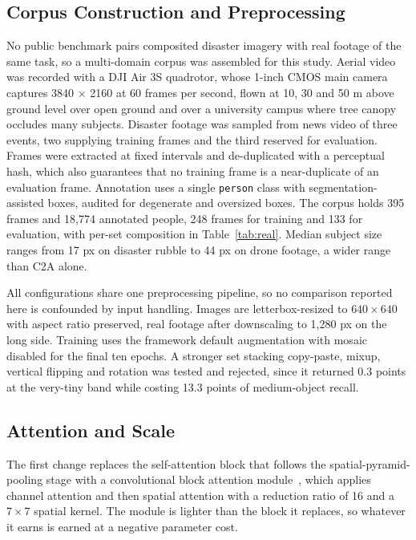 \documentclass[conference,a4paper]{IEEEtran}
\begin{document}
\subsection{Corpus Construction and Preprocessing}
\label{sec:corpus}
No public benchmark pairs composited disaster imagery with real footage of the
same task, so a multi-domain corpus was assembled for this study. Aerial video
was recorded with a DJI Air 3S quadrotor, whose 1-inch CMOS main camera captures
3840 $\times$ 2160 at 60 frames per second, flown at 10, 30 and 50 m above
ground level over open ground and over a
university campus where tree canopy occludes many subjects. Disaster footage was
sampled from news video of three events, two supplying training frames and the
third reserved for evaluation. Frames were
extracted at fixed intervals and de-duplicated with a perceptual hash, which also
guarantees that no training frame is a near-duplicate of an evaluation frame.
Annotation uses a single \texttt{person} class with segmentation-assisted boxes,
audited for degenerate and oversized boxes. The corpus holds 395 frames and
18{,}774 annotated people, 248 frames for training and 133 for evaluation, with
per-set composition in Table~\ref{tab:real}. Median subject size ranges from
17 px on disaster rubble to 44 px on drone footage, a wider range than C2A alone.

All configurations share one preprocessing pipeline, so no comparison reported
here is confounded by input handling. Images are letterbox-resized to
$640 \times 640$ with aspect ratio preserved, real footage after downscaling to
1{,}280 px on the long side. Training uses the framework default augmentation
with mosaic disabled for the final ten epochs. A stronger set stacking
copy-paste, mixup, vertical flipping and rotation was tested and rejected, since
it returned 0.3 points at the very-tiny band while costing 13.3 points of
medium-object recall.

\subsection{Attention and Scale}
The first change replaces the self-attention block that follows the
spatial-pyramid-pooling stage with a convolutional block attention
module~\cite{woo2018cbam}, which applies channel attention and then spatial
attention with a reduction ratio of 16 and a $7 \times 7$ spatial kernel. The
module is lighter than the block it replaces, so whatever it earns is earned at
a negative parameter cost.
\end{document}

